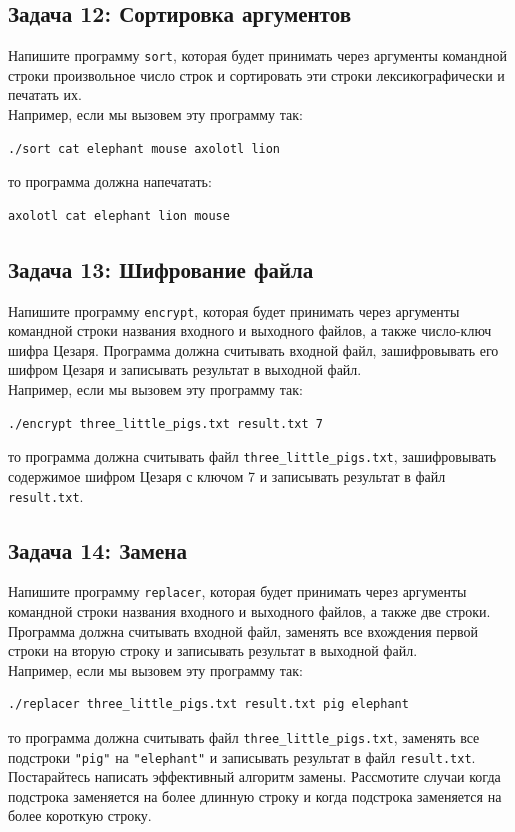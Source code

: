\documentclass{article}
\begin{document}
\subsection*{Задача 12: Сортировка аргументов}
Напишите программу \texttt{sort}, которая будет принимать через аргументы командной строки произвольное число строк и сортировать эти строки лексикографически и печатать их.\\
Например, если мы вызовем эту программу так:
\begin{verbatim}
./sort cat elephant mouse axolotl lion
\end{verbatim}
то программа должна напечатать:
\begin{verbatim}
axolotl cat elephant lion mouse
\end{verbatim}


\subsection*{Задача 13: Шифрование файла}
Напишите программу \texttt{encrypt}, которая будет принимать через аргументы командной строки названия входного и выходного файлов, а также число-ключ шифра Цезаря. Программа должна считывать входной файл, зашифровывать его шифром Цезаря и записывать результат в выходной файл.\\
Например, если мы вызовем эту программу так:
\begin{verbatim}
./encrypt three_little_pigs.txt result.txt 7
\end{verbatim}
то программа должна считывать файл \texttt{three\_little\_pigs.txt}, зашифровывать содержимое шифром Цезаря с ключом 7 и записывать результат в файл \texttt{result.txt}.


\subsection*{Задача 14: Замена}
Напишите программу \texttt{replacer}, которая будет принимать через аргументы командной строки названия входного и выходного файлов, а также две строки. Программа должна считывать входной файл, заменять все вхождения первой строки на вторую строку и записывать результат в выходной файл.\\
Например, если мы вызовем эту программу так:
\begin{verbatim}
./replacer three_little_pigs.txt result.txt pig elephant
\end{verbatim}
то программа должна считывать файл \texttt{three\_little\_pigs.txt}, заменять все подстроки \texttt{"pig"} на \texttt{"elephant"} и записывать результат в файл \texttt{result.txt}. Постарайтесь написать эффективный алгоритм замены. Рассмотите случаи когда подстрока заменяется на более длинную строку и когда подстрока заменяется на более короткую строку.
\end{document}
